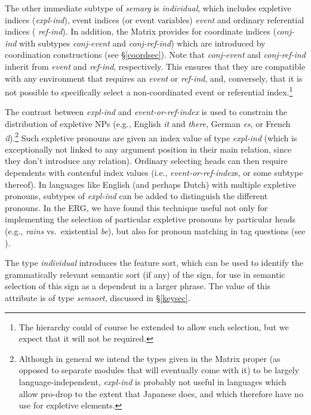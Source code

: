 \documentclass[12pt]{article}
\begin{document}
The other immediate subtype of {\it semarg} is {\it individual},
which includes expletive indices ({\it expl-ind}), event indices (or
event variables) {\it event} and ordinary referential indices ({\it
ref-ind}).  In addition, the Matrix provides for coordinate
indices ({\it conj-ind} with subtypes {\it conj-event} and {\it
conj-ref-ind}) which are introduced by coordination constructions (see
\S\ref{coordsec}).  Note that {\it conj-event} and {\it conj-ref-ind}
inherit from {\it event} and {\it ref-ind}, respectively.  This
ensures that they are compatible with any environment that requires an
{\it event} or {\it ref-ind}, and, conversely, that it is not possible
to specifically select a non-coordinated event or referential
index.\footnote{The hierarchy could of course be extended to allow
such selection, but we expect that it will not be required.}

The contrast between {\it expl-ind} and {\it event-or-ref-index} is
used to constrain the distribution of expletive NPs (e.g., English
{\it it} and {\it there}, German {\it es}, or French {\it
il}).\footnote{Although in general we intend the types given in the
Matrix proper (as opposed to separate modules that will eventually
come with it) to be largely language-independent, 
{\it expl-ind} is probably not useful in languages
which allow pro-drop to the extent that Japanese does, and which therefore
have no use for expletive elements.}  Such expletive pronouns are given
an {\sc index} value of type {\it expl-ind} (which is exceptionally not
linked to any argument position in their main relation, since they
don't introduce any relation).  Ordinary selecting heads can then require 
dependents with
contenful {\sc index} values (i.e., {\it event-or-ref-index}s, or
some subtype thereof).  In languages like English (and perhaps Dutch) with
multiple expletive pronouns, subtypes of {\it expl-ind} can be added
to distinguish the different pronouns.  In the ERG, we have found
this technique useful not only for implementing the selection of 
particular expletive pronouns by particular heads (e.g., {\it rains} vs.\
existential {\it be}), but also for pronoun matching in tag questions
(see \citeboth{Ben:Fli:99}).

The type {\it individual} introduces the feature {\sc sort}, which can be
used to identify the grammatically relevant semantic sort (if any) of the
sign, for use in semantic selection of this sign as a dependent in a larger
phrase.  The value of this attribute is of type {\it semsort}, discussed
in \S\ref{keysec}.
\end{document}
